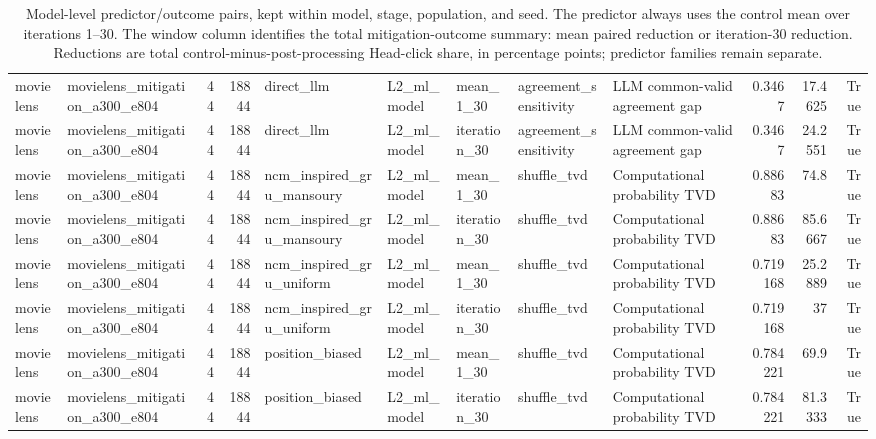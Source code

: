 \begin{table}[htbp!]
\begin{tabular}{llrrlllllrrr}
movielens & movielens\_mitigation\_a300\_e804 & 44 & 18844 & direct\_llm & L2\_ml\_model & mean\_1\_30 & agreement\_sensitivity & LLM common-valid agreement gap & 0.3467 & 17.4625 & True \\
movielens & movielens\_mitigation\_a300\_e804 & 44 & 18844 & direct\_llm & L2\_ml\_model & iteration\_30 & agreement\_sensitivity & LLM common-valid agreement gap & 0.3467 & 24.2551 & True \\
movielens & movielens\_mitigation\_a300\_e804 & 44 & 18844 & ncm\_inspired\_gru\_mansoury & L2\_ml\_model & mean\_1\_30 & shuffle\_tvd & Computational probability TVD & 0.88683 & 74.8 & True \\
movielens & movielens\_mitigation\_a300\_e804 & 44 & 18844 & ncm\_inspired\_gru\_mansoury & L2\_ml\_model & iteration\_30 & shuffle\_tvd & Computational probability TVD & 0.88683 & 85.6667 & True \\
movielens & movielens\_mitigation\_a300\_e804 & 44 & 18844 & ncm\_inspired\_gru\_uniform & L2\_ml\_model & mean\_1\_30 & shuffle\_tvd & Computational probability TVD & 0.719168 & 25.2889 & True \\
movielens & movielens\_mitigation\_a300\_e804 & 44 & 18844 & ncm\_inspired\_gru\_uniform & L2\_ml\_model & iteration\_30 & shuffle\_tvd & Computational probability TVD & 0.719168 & 37 & True \\
movielens & movielens\_mitigation\_a300\_e804 & 44 & 18844 & position\_biased & L2\_ml\_model & mean\_1\_30 & shuffle\_tvd & Computational probability TVD & 0.784221 & 69.9 & True \\
movielens & movielens\_mitigation\_a300\_e804 & 44 & 18844 & position\_biased & L2\_ml\_model & iteration\_30 & shuffle\_tvd & Computational probability TVD & 0.784221 & 81.3333 & True \\
\hline
\end{tabular}
\caption{Model-level predictor/outcome pairs, kept within model, stage, population, and seed. The predictor always uses the control mean over iterations 1–30. The window column identifies the total mitigation-outcome summary: mean paired reduction or iteration-30 reduction. Reductions are total control-minus-post-processing Head-click share, in percentage points; predictor families remain separate.}
\label{chap:results:tab:rq5_order_sensitivity_pairs}
\end{table}
